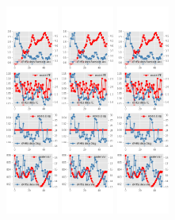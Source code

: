 \documentclass[]{article}
\begin{document}
\begin{figure}[ht]
\begin{subfigure}[b]{\textwidth}
		\includegraphics[width=0.19\textwidth]{figures/sce_se_est_sv_diag2.png}
		\includegraphics[width=0.19\textwidth]{figures/sce_se_est_sv_diag3.png}
		\includegraphics[width=0.19\textwidth]{figures/sce_se_est_sv_diag4.png}

\end{subfigure}
\end{figure}
\end{document}
